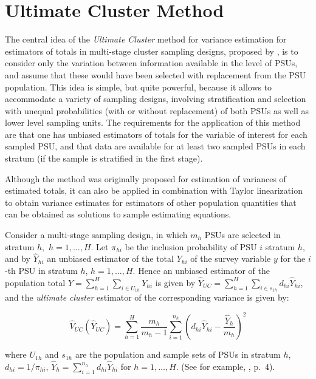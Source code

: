 \documentclass[
  12pt,
]{book}
\begin{document}
\section{Ultimate Cluster Method}\label{ultimate-cluster-method}

The central idea of the \emph{Ultimate Cluster} method for variance estimation for estimators of totals in multi-stage cluster sampling designs, proposed by \citep{Hansen1953}, is to consider only the variation between information available in the level of PSUs, and assume that these would have been selected with replacement from the PSU population. This idea is simple, but quite powerful, because it allows to accommodate a variety of sampling designs, involving stratification and selection with unequal probabilities (with or without replacement) of both PSUs as well as lower level sampling units. The requirements for the application of this method are that one has unbiased estimators of totals for the variable of interest for each sampled PSU, and that data are available for at least two sampled PSUs in each stratum (if the sample is stratified in the first stage).

Although the method was originally proposed for estimation of variances of estimated totals, it can also be applied in combination with Taylor linearization to obtain variance estimates for estimators of other population quantities that can be obtained as solutions to sample estimating equations.

Consider a multi-stage sampling design, in which \(m_{h}\) PSUs are selected in stratum \(h,\) \(h=1,\ldots ,H\). Let \(\pi_{hi}\) be the inclusion probability of PSU \(i\) stratum \(h\), and by \(\widehat{Y}_{hi}\) an unbiased estimator of the total \(Y_{hi}\) of the survey variable \(y\) for the \(i\)-th PSU in stratum \(h\), \(h=1,\ldots ,H\). Hence an unbiased estimator of the population total \(Y = \sum_{h=1}^{H} \sum_{i \in U_{1h}} Y_{hi}\) is given by \(\widehat{Y}_{UC} = \sum_{h=1}^{H} \sum_{i \in s_{1h}} d_{hi} \widehat{Y}_{hi}\), and the \emph{ultimate cluster} estimator of the corresponding variance is given by:

\[
\widehat{V}_{UC} \left( \widehat{Y}_{UC}\right) = \sum_{h=1}^{H} \frac{m_{h}}
{m_{h}-1} \sum_{i=1}^{n_{h}} \left( d_{hi} \widehat{Y}_{hi} - \frac{\widehat{Y}_{h}}{m_{h}} \right) ^{2}
\]

where \(U_{1h}\) and \(s_{1h}\) are the population and sample sets of PSUs in stratum \(h\), \(d_{hi} = 1 / \pi_{hi}\), \(\widehat{Y}_{h} = \sum_{i=1}^{n_{h}} d_{hi} \widehat{Y}_{hi}\) for \(h=1,\ldots ,H\). (See for example, \citep{Shah1993}, p.~4).
\end{document}

